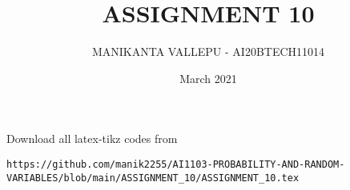 \documentclass[journal,12pt,twocolumn]{IEEEtran}
\date{March 2021}
\DeclareMathOperator*{\Res}{Res}
\begin{document}
\newcommand{\BEQA}{\begin{eqnarray}}
\newcommand{\EEQA}{\end{eqnarray}}
\newcommand{\define}{\stackrel{\triangle}{=}}

\raggedbottom
\setlength{\parindent}{0pt}
\providecommand{\mbf}{\mathbf}
\providecommand{\pr}[1]{\ensuremath{\Pr\left(#1\right)}}
\providecommand{\qfunc}[1]{\ensuremath{Q\left(#1\right)}}
\providecommand{\fn}[1]{\ensuremath{f\left(#1\right)}}
\providecommand{\e}[1]{\ensuremath{E\left(#1\right)}}
\providecommand{\sbrak}[1]{\ensuremath{{}\left[#1\right]}}
\providecommand{\lsbrak}[1]{\ensuremath{{}\left[#1\right.}}
\providecommand{\rsbrak}[1]{\ensuremath{{}\left.#1\right]}}
\providecommand{\brak}[1]{\ensuremath{\left(#1\right)}}
\providecommand{\lbrak}[1]{\ensuremath{\left(#1\right.}}
\providecommand{\rbrak}[1]{\ensuremath{\left.#1\right)}}
\providecommand{\cbrak}[1]{\ensuremath{\left\{#1\right\}}}
\providecommand{\lcbrak}[1]{\ensuremath{\left\{#1\right.}}
\providecommand{\rcbrak}[1]{\ensuremath{\left.#1\right\}}}
\theoremstyle{remark}
\newtheorem{rem}{Remark}
\newcommand{\sgn}{\mathop{\mathrm{sgn}}}
\providecommand{\abs}[1]{\vert#1\vert}
\providecommand{\res}[1]{\Res\displaylimits_{#1}} 
\providecommand{\norm}[1]{\lVert#1\rVert}
\providecommand{\mtx}[1]{\mathbf{#1}}
\providecommand{\mean}[1]{E[ #1 ]}
\providecommand{\fourier}{\overset{\mathcal{F}}{ \rightleftharpoons}}
\providecommand{\system}{\overset{\mathcal{H}}{ \longleftrightarrow}}
\newcommand{\solution}{\noindent \textbf{Solution: }}
\newcommand{\cosec}{\,\text{cosec}\,}
\providecommand{\dec}[2]{\ensuremath{\overset{#1}{\underset{#2}{\gtrless}}}}
\newcommand{\myvec}[1]{\ensuremath{\begin{pmatrix}#1\end{pmatrix}}}
\newcommand{\mydet}[1]{\ensuremath{\begin{vmatrix}#1\end{vmatrix}}}
\makeatletter
\vspace{3cm}
\title{ASSIGNMENT 10}
\author{MANIKANTA VALLEPU - AI20BTECH11014}
\maketitle
\newpage
\bigskip
\renewcommand{\thetable}{\theenumi}
Download all latex-tikz codes from 
\begin{lstlisting}
https://github.com/manik2255/AI1103-PROBABILITY-AND-RANDOM-VARIABLES/blob/main/ASSIGNMENT_10/ASSIGNMENT_10.tex
\end{lstlisting}
\end{document}
